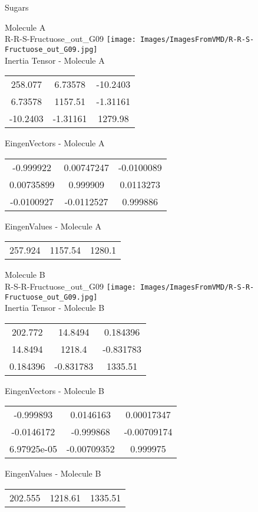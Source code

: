 \vtab[-2cm]
\begin{center}
{\large Sugars}
\end{center}
\begin{multicols}{2}
\begin{center}
Molecule A \\ 
R-R-S-Fructuose\_out\_G09
\texttt{[image: Images/ImagesFromVMD/R-R-S-Fructuose\_out\_G09.jpg]}
\\
Inertia Tensor - Molecule A \\
\vtab
\begin{tabular}{|c c c|}
258.077	 & 	6.73578	 & 	-10.2403	 \\
6.73578	 & 	1157.51	 & 	-1.31161	 \\
-10.2403	 & 	-1.31161	 & 	1279.98
\end{tabular}

\vtab
 EingenVectors - Molecule A     \\
\vtab
\begin{tabular}{|c c c|}
-0.999922	 & 	0.00747247	 & 	-0.0100089	 \\
0.00735899	 & 	0.999909	 & 	0.0113273	 \\
-0.0100927	 & 	-0.0112527	 & 	0.999886
\end{tabular}

\vtab
 EingenValues - Molecule A     \\
\vtab
\begin{tabular}{|c c c|}
257.924	 & 	1157.54	 & 	1280.1
\end{tabular}
\columnbreak

Molecule B \\ 
R-S-R-Fructuose\_out\_G09
\texttt{[image: Images/ImagesFromVMD/R-S-R-Fructuose\_out\_G09.jpg]}
\\
Inertia Tensor - Molecule B \\
\vtab
\begin{tabular}{|c c c|}
202.772	 & 	14.8494	 & 	0.184396	 \\
14.8494	 & 	1218.4	 & 	-0.831783	 \\
0.184396	 & 	-0.831783	 & 	1335.51
\end{tabular}

\vtab
 EingenVectors - Molecule B     \\
\vtab
\begin{tabular}{|c c c|}
-0.999893	 & 	0.0146163	 & 	0.00017347	 \\
-0.0146172	 & 	-0.999868	 & 	-0.00709174	 \\
6.97925e-05	 & 	-0.00709352	 & 	0.999975
\end{tabular}

\vtab
 EingenValues - Molecule B     \\
\vtab
\begin{tabular}{|c c c|}
202.555	 & 	1218.61	 & 	1335.51
\end{tabular}

\end{center}
\end{multicols}
